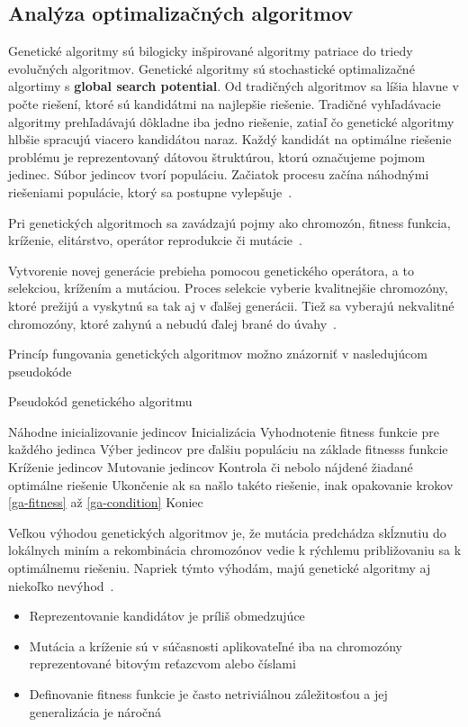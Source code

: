 \documentclass[a4paper,slovak,12pt,appendix]{article}
\begin{document}
\subsection{Analýza optimalizačných algoritmov}
Genetické algoritmy sú bilogicky inšpirované algoritmy patriace do triedy
evolučných algoritmov. Genetické algoritmy sú stochastické optimalizačné
algortimy s \textbf{global search potential}. Od tradičných algoritmov sa líšia
hlavne v počte riešení, ktoré sú kandidátmi na najlepšie riešenie. Tradičné
vyhľadávacie algoritmy prehľadávajú dôkladne iba jedno riešenie, zatiaľ čo
genetické algoritmy hlbšie spracujú viacero kandidátou naraz. Každý kandidát na
optimálne riešenie problému je reprezentovaný dátovou štruktúrou, ktorú
označujeme pojmom jedinec. Súbor jedincov tvorí populáciu. Začiatok procesu
začína náhodnými riešeniami populácie, ktorý sa postupne
vylepšuje~\cite{Chavan2015}.

Pri genetických algoritmoch sa zavádzajú pojmy ako chromozón, fitness funkcia,
kríženie, elitárstvo, operátor reprodukcie či mutácie~\cite{Chavan2015}.

Vytvorenie novej generácie prebieha pomocou genetického operátora,
a to selekciou, krížením a mutáciou. Proces selekcie vyberie kvalitnejšie
chromozóny, ktoré prežijú a vyskytnú sa tak aj v ďalšej generácii. Tiež sa
vyberajú nekvalitné chromozóny, ktoré zahynú a nebudú ďalej brané do
úvahy~\cite{Simonova2007}.

Princíp fungovania genetických algoritmov možno znázorniť v nasledujúcom
pseudokóde~\cite{Chavan2015}
\begin{algorithm}
  \caption{Pseudokód genetického algoritmu}
  \begin{algorithmic}[1]
    \State Náhodne inicializovanie jedincov Inicializácia
    \State Vyhodnotenie fitness funkcie pre každého jedinca \label{ga-fitness}
    \State Výber jedincov pre ďalšiu populáciu na základe fitnesss funkcie \label{ga-selection}
    \State Kríženie jedincov \label{ga-crossing}
    \State Mutovanie jedincov \label{ga-mutation}
    \State Kontrola či nebolo nájdené žiadané optimálne riešenie \label{ga-condition}
    \State Ukončenie ak sa našlo takéto riešenie, inak opakovanie krokov \ref{ga-fitness} až \ref{ga-condition}
    \State Koniec
  \end{algorithmic}
\end{algorithm}

Veľkou výhodou genetických algoritmov je, že mutácia predchádza skĺznutiu do
lokálnych miním a rekombinácia chromozónov vedie k rýchlemu približovaniu
sa k optimálnemu riešeniu. Napriek týmto výhodám, majú genetické algoritmy aj
niekoľko nevýhod~\cite{Deolekar2016}.
\begin{itemize}
  \item Reprezentovanie kandidátov je príliš obmedzujúce
  \item Mutácia a kríženie sú v súčasnosti aplikovateľné iba na chromozóny
        reprezentované bitovým reťazcvom alebo číslami
  \item Definovanie fitness funkcie je často netriviálnou záležitosťou
        a jej generalizácia je náročná
\end{itemize}
\end{document}
